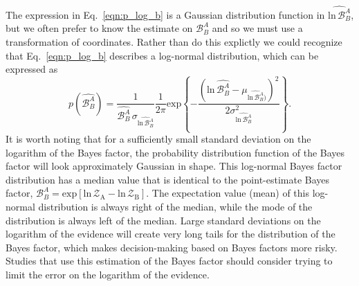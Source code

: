 The expression in Eq.~\ref{eqn:p_log_b} is a Gaussian distribution function in $\widehat{\mathrm{ln} \, \mathcal{B}^A_B}$, but we often prefer to know the estimate on $\mathcal{B}^A_B$ and so we must use a transformation of coordinates. Rather than do this explictly we could recognize that Eq.~\ref{eqn:p_log_b} describes a log-normal distribution, which can be expressed as
\begin{equation}
    p(\widehat{\mathcal{B}^A_B}) = \frac{1}{\widehat{\mathcal{B}^A_B} \, \sigma_{\widehat{\mathrm{ln} \, \mathcal{B}^A_B}}} \frac{1}{2\pi} \mathrm{exp} \left \{-\frac{\left(\mathrm{ln} \, \widehat{\mathcal{B}^A_B} - \mu_{\widehat{\mathrm{ln} \, \mathcal{B}^A_B})}\right)^2} {2 \sigma^2_{\widehat{\mathrm{ln} \, \mathcal{B}^A_B}}}  \right\}.
\end{equation}
It is worth noting that for a sufficiently small standard deviation on the logarithm of the Bayes factor, the probability distribution function of the Bayes factor will look approximately Gaussian in shape. This log-normal Bayes factor distribution has a median value that is identical to the point-estimate Bayes factor, $\mathcal{B}^A_B = \mathrm{exp} \left[\mathrm{ln} \, \mathcal{Z}_{\mathrm{A}} - \mathrm{ln} \, \mathcal{Z}_{\mathrm{B}} \right]$. The expectation value (mean) of this log-normal distribution is always right of the median, while the mode of the distribution is always left of the median. Large standard deviations on the logarithm of the evidence will create very long tails for the distribution of the Bayes factor, which makes decision-making based on Bayes factors more risky. Studies that use this estimation of the Bayes factor should consider trying to limit the error on the logarithm of the evidence.

